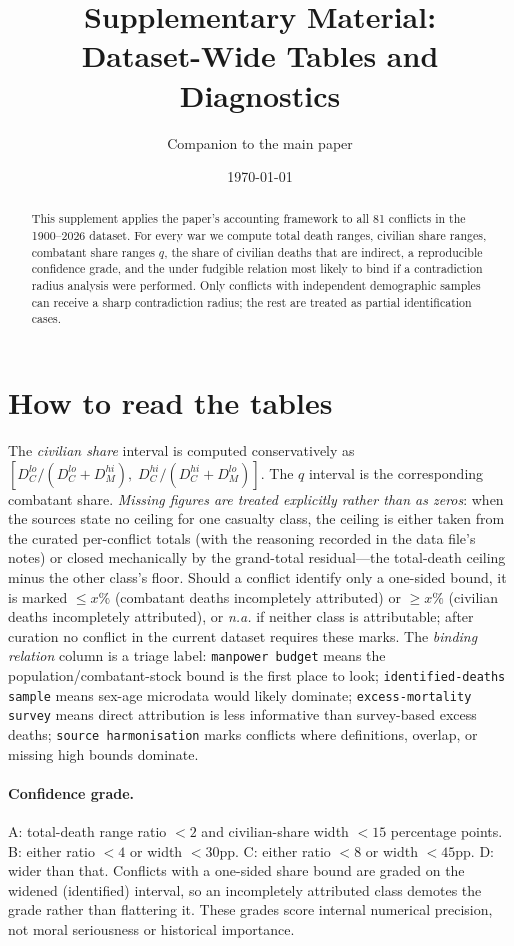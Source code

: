 \documentclass[11pt]{article}
\title{Supplementary Material:\\ Dataset-Wide Tables and Diagnostics}
\author{Companion to the main paper}
\date{\today}
\begin{document}
\maketitle
\begin{abstract}\raggedright\small
This supplement applies the paper's accounting framework to all 81 conflicts in the 1900--2026 dataset. For every war we compute total death ranges, civilian share ranges, combatant share ranges $q$, the share of civilian deaths that are indirect, a reproducible confidence grade, and the under fudgible relation most likely to bind if a contradiction radius analysis were performed. Only conflicts with independent demographic samples can receive a sharp contradiction radius; the rest are treated as partial identification cases.
\end{abstract}
\tableofcontents

\section{How to read the tables}
The \emph{civilian share} interval is computed conservatively as $[D_C^{lo}/(D_C^{lo}+D_M^{hi}),\;D_C^{hi}/(D_C^{hi}+D_M^{lo})]$. The $q$ interval is the corresponding combatant share. \emph{Missing figures are treated explicitly rather than as zeros}: when the sources state no ceiling for one casualty class, the ceiling is either taken from the curated per-conflict totals (with the reasoning recorded in the data file's notes) or closed mechanically by the grand-total residual---the total-death ceiling minus the other class's floor. Should a conflict identify only a one-sided bound, it is marked $\le x\%$ (combatant deaths incompletely attributed) or $\ge x\%$ (civilian deaths incompletely attributed), or \emph{n.a.} if neither class is attributable; after curation no conflict in the current dataset requires these marks. The \emph{binding relation} column is a triage label: \texttt{manpower budget} means the population/combatant-stock bound is the first place to look; \texttt{identified-deaths sample} means sex-age microdata would likely dominate; \texttt{excess-mortality survey} means direct attribution is less informative than survey-based excess deaths; \texttt{source harmonisation} marks conflicts where definitions, overlap, or missing high bounds dominate.

\paragraph{Confidence grade.} A: total-death range ratio $<2$ and civilian-share width $<15$ percentage points. B: either ratio $<4$ or width $<30$pp. C: either ratio $<8$ or width $<45$pp. D: wider than that. Conflicts with a one-sided share bound are graded on the widened (identified) interval, so an incompletely attributed class demotes the grade rather than flattering it. These grades score internal numerical precision, not moral seriousness or historical importance.
\end{document}
